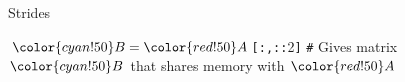 \documentclass[utf8x,xcolor=pdftex,dvipsnames,table]{beamer}
\begin{document}
\begin{frame}{Strides}
\begin{center}
\end{center}
${\color{cyan!50}B} = {\color{red!50}A}$\texttt{[:,::}2\texttt{]} \texttt{\#} Gives matrix ${\color{cyan!50}B}$ that shares memory with ${\color{red!50}A}$
\end{frame}
\end{document}
